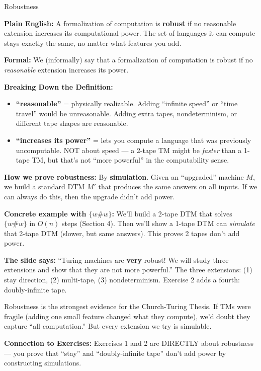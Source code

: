 \documentclass[11pt,a4paper]{article}
\newcommand{\kt}[1]{\par\vspace{0.3em}\colorbox{yellow!60}{\parbox{\dimexpr\linewidth-2\fboxsep}{#1}}\vspace{0.3em}}
\begin{document}
\begin{definitionbox}{Robustness}

\textbf{Plain English:} A formalization of computation is \textbf{robust} if no reasonable extension increases its computational power. The set of languages it can compute stays exactly the same, no matter what features you add.

\textbf{Formal:} We (informally) say that a formalization of computation is robust if no \textit{reasonable} extension increases its power.

\textbf{Breaking Down the Definition:}
\begin{itemize}[nosep]
\item \textbf{``reasonable''} = physically realizable. Adding ``infinite speed'' or ``time travel'' would be unreasonable. Adding extra tapes, nondeterminism, or different tape shapes are reasonable.
\item \textbf{``increases its power''} = lets you compute a language that was previously uncomputable. NOT about speed --- a 2-tape TM might be \textit{faster} than a 1-tape TM, but that's not ``more powerful'' in the computability sense.
\end{itemize}

\textbf{How we prove robustness:} By \textbf{simulation}. Given an ``upgraded'' machine $M$, we build a standard DTM $M'$ that produces the same answers on all inputs. If we can always do this, then the upgrade didn't add power.

\textbf{Concrete example with $\{w\#w\}$:} We'll build a 2-tape DTM that solves $\{w\#w\}$ in $O(n)$ steps (Section 4). Then we'll show a 1-tape DTM can \textit{simulate} that 2-tape DTM (slower, but same answers). This proves 2 tapes don't add power.

\textbf{The slide says:} ``Turing machines are \textbf{very} robust! We will study three extensions and show that they are not more powerful.'' The three extensions: (1) stay direction, (2) multi-tape, (3) nondeterminism. Exercise 2 adds a fourth: doubly-infinite tape.

\kt{Robustness is the strongest evidence for the Church-Turing Thesis. If TMs were fragile (adding one small feature changed what they compute), we'd doubt they capture ``all computation.'' But every extension we try is simulable.}

\textbf{Connection to Exercises:} Exercises 1 and 2 are DIRECTLY about robustness --- you prove that ``stay'' and ``doubly-infinite tape'' don't add power by constructing simulations.
\end{definitionbox}
\end{document}
